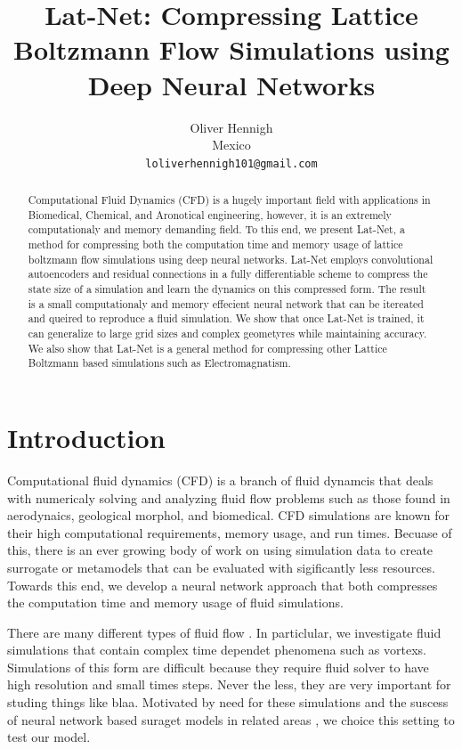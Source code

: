 \documentclass{article}
\title{Lat-Net: Compressing Lattice Boltzmann Flow Simulations using Deep Neural Networks}
\author{
  Oliver Hennigh \\
  Mexico \\
  \texttt{loliverhennigh101@gmail.com} \\
}
\begin{document}

\maketitle

\begin{abstract}
Computational Fluid Dynamics (CFD) is a hugely important field with applications in Biomedical, Chemical, and Aronotical engineering, however, it is an extremely computationaly and memory demanding field. To this end, we present Lat-Net, a method for compressing both the computation time and memory usage of lattice boltzmann flow simulations using deep neural networks. Lat-Net employs convolutional autoencoders and residual connections in a fully differentiable scheme to compress the state size of a simulation and learn the dynamics on this compressed form. The result is a small computationaly and memory effecient neural network that can be itereated and queired to reproduce a fluid simulation. We show that once Lat-Net is trained, it can generalize to large grid sizes and complex geometyres while maintaining accuracy. We also show that Lat-Net is a general method for compressing other Lattice Boltzmann based simulations such as Electromagnatism.

\end{abstract}

\section{Introduction}

Computational fluid dynamics (CFD) is a branch of fluid dynamcis that deals with numericaly solving and analyzing fluid flow problems such as those found in aerodynaics, geological morphol, and biomedical. CFD simulations are known for their high computational requirements, memory usage, and run times. Becuase of this, there is an ever growing body of work on using simulation data to create surrogate or metamodels that can be evaluated with sigificantly less resources. Towards this end, we develop a neural network approach that both compresses the computation time and memory usage of fluid simulations.

There are many different types of fluid flow . In particlular, we investigate fluid simulations that contain complex time dependet phenomena such as vortexs. Simulations of this form are difficult because they require fluid solver to have high resolution and small times steps. Never the less, they are very important for studing things like blaa. Motivated by need for these simulations and the suscess of neural network based suraget models in related areas \cite{tompson2016accelerating} \cite{guo2016convolutional}, we choice this setting to test our model.
\end{document}
